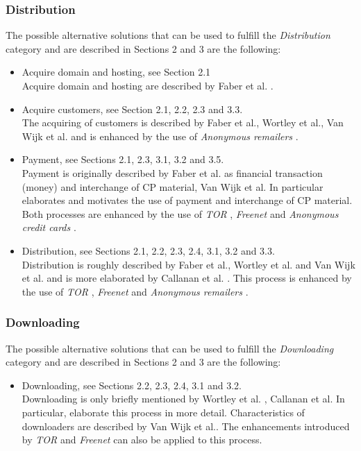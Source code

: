 \documentclass{sig-alternate-br}
\begin{document}
\subsubsection{Distribution}
The possible alternative solutions that can be used to fulfill the \textit{Distribution} category and are described in Sections 2 and 3 are the following:
\begin{itemize}
	\item Acquire domain and hosting, see Section 2.1\\
		Acquire domain and hosting are described by Faber et al. \cite{en2011phishing}.
	\item Acquire customers, see Section 2.1, 2.2, 2.3 and 3.3.\\
		The acquiring of customers is described by Faber et al., Wortley et al., Van Wijk et al. \cite{en2011phishing, wortley2006child, wijk2009achter} and is enhanced by the use of \textit{Anonymous remailers} \cite{wall2007cybercrime}.
	\item Payment, see Sections 2.1, 2.3, 3.1, 3.2 and 3.5.\\
		Payment is originally described by Faber et al. \cite{en2011phishing} as financial transaction (money) and interchange of CP material, Van Wijk et al. In particular \cite{wijk2009achter} elaborates and motivates the use of payment and interchange of CP material. Both processes are enhanced by the use of \textit{TOR} \cite{dingledine2004tor}, \textit{Freenet} \cite{clarke2001freenet} and \textit{Anonymous credit cards} \cite{wall2007cybercrime}.
	\item Distribution, see Sections 2.1, 2.2, 2.3, 2.4, 3.1, 3.2 and 3.3.\\
		Distribution is roughly described by Faber et al., Wortley et al. and Van Wijk et al. \cite{en2011phishing,wortley2006child,wijk2009achter} and is more elaborated by Callanan et al. \cite{callanan2009internet}. This process is enhanced by the use of \textit{TOR} \cite{dingledine2004tor}, \textit{Freenet} \cite{clarke2001freenet} and \textit{Anonymous remailers} \cite{wall2007cybercrime}.
\end{itemize}

\subsubsection{Downloading}
The possible alternative solutions	 that can be used to fulfill the \textit{Downloading} category and are described in Sections 2 and 3 are the following:
\begin{itemize}
	\item Downloading, see Sections 2.2, 2.3, 2.4, 3.1 and 3.2.\\
		Downloading is only briefly mentioned by Wortley et al. \cite{wortley2006child}, Callanan et al. In particular, \cite{callanan2009internet} elaborate this process in more detail. Characteristics of downloaders are described by Van Wijk et al.\cite{wijk2009achter}. The enhancements introduced by \textit{TOR} \cite{dingledine2004tor} and \textit{Freenet} \cite{clarke2001freenet} can also be applied to this process.
\end{itemize}
\end{document}
